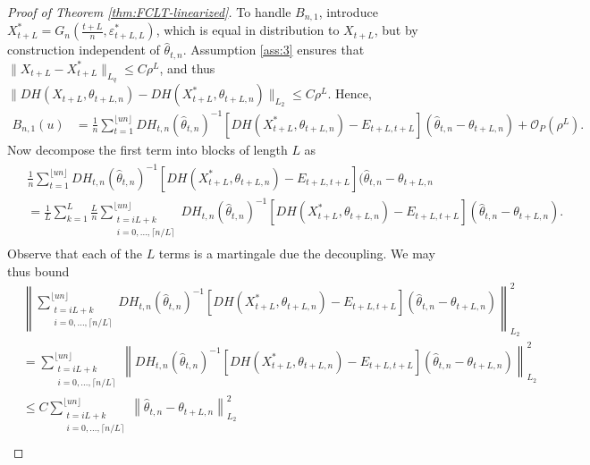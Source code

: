 \documentclass[10pt, a4paper]{article}
\theoremstyle{assumption}
\theoremstyle{definition}
\theoremstyle{theorem}
\begin{document}
\begin{proof}[Proof of Theorem \ref{thm:FCLT-linearized}]
    To handle $B_{n,1}$, introduce $X_{t+L}^* = G_n(\frac{t+L}{n}, \varepsilon^*_{t+L, L})$, which is equal in distribution to $X_{t+L}$, but by construction independent of $\widehat{\theta}_{t,n}$.
    Assumption \eqref{ass:3} ensures that $\|X_{t+L}-X_{t+L}^*\|_{L_q}\leq C \rho^L$, and thus $\|DH(X_{t+L}, \theta_{t+L,n}) - DH(X_{t+L}^*, \theta_{t+L,n})\|_{L_2} \leq C \rho^L$. 
    Hence,
    \begin{align*}
        B_{n,1}(u) 
        &= \frac{1}{n} \sum_{t=1}^{\lfloor un \rfloor} DH_{t,n}(\widehat{\theta}_{t,n})^{-1} \left[ D H(X_{t+L}^*, \theta_{t+L,n}) - E_{t+L,t+L} \right](\widehat{\theta}_{t,n}-\theta_{t+L,n}) +\mathcal{O}_P\left( \rho^L \right).
    \end{align*}
    Now decompose the first term into blocks of length $L$ as
    \begin{align}
    \begin{split}
        & \frac{1}{n} \sum_{t=1}^{\lfloor un \rfloor} DH_{t,n}(\widehat{\theta}_{t,n})^{-1} \left[ D H(X_{t+L}^*, \theta_{t+L,n}) - E_{t+L,t+L} \right](\widehat{\theta}_{t,n}-\theta_{t+L,n}\\
        &=  \frac{1}{L}\sum_{k=1}^L \frac{L}{n} \sum_{\substack{t=iL+k\\ i=0,\ldots, \lceil n/L\rceil}}^{\lfloor un\rfloor}  DH_{t,n}(\widehat{\theta}_{t,n})^{-1} \left[ D H(X_{t+L}^*, \theta_{t+L,n}) - E_{t+L,t+L} \right](\widehat{\theta}_{t,n}-\theta_{t+L,n}).
    \end{split}\label{eqn:remainder-27}
    \end{align}
    Observe that each of the $L$ terms is a martingale due the decoupling. We may thus bound
    \begin{align*}
        &\left\|\sum_{\substack{t=iL+k\\ i=0,\ldots, \lceil n/L\rceil}}^{\lfloor un\rfloor}  DH_{t,n}(\widehat{\theta}_{t,n})^{-1} \left[ D H(X_{t+L}^*, \theta_{t+L,n}) - E_{t+L,t+L} \right](\widehat{\theta}_{t,n}-\theta_{t+L,n})\right\|_{L_2}^2 \\
        &= \sum_{\substack{t=iL+k\\ i=0,\ldots, \lceil n/L\rceil}}^{\lfloor un\rfloor}  \left\|DH_{t,n}(\widehat{\theta}_{t,n})^{-1} \left[ D H(X_{t+L}^*, \theta_{t+L,n}) - E_{t+L,t+L} \right](\widehat{\theta}_{t,n}-\theta_{t+L,n})\right\|_{L_2}^2 \\
        &\leq C \sum_{\substack{t=iL+k\\ i=0,\ldots, \lceil n/L\rceil}}^{\lfloor un\rfloor}  \left\|\widehat{\theta}_{t,n}-\theta_{t+L,n}\right\|_{L_2}^2\\

\end{align*}
\end{proof}
\end{document}
